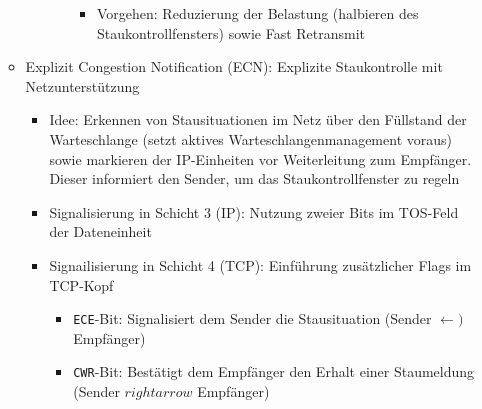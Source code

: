 \begin{itemize}
\begin{itemize}
\begin{enumerate}
\begin{itemize}
\begin{itemize}
					\item Vorgehen: Reduzierung der Belastung (halbieren des Staukontrollfensters) sowie Fast Retransmit
				\end{itemize}
			\end{itemize}
		\end{enumerate}
		\item Explizit Congestion Notification (ECN): Explizite Staukontrolle mit Netzunterstützung
		\begin{itemize}
			\item Idee: Erkennen von Stausituationen im Netz über den Füllstand der Warteschlange (setzt aktives Warteschlangenmanagement voraus) sowie markieren der IP-Einheiten vor Weiterleitung zum Empfänger. Dieser informiert den Sender, um das Staukontrollfenster zu regeln
			\item Signalisierung in Schicht 3 (IP): Nutzung zweier Bits im TOS-Feld der Dateneinheit
			\item Signailisierung in Schicht 4 (TCP): Einführung zusätzlicher Flags im TCP-Kopf
			\begin{itemize}
				\item \texttt{ECE}-Bit: Signalisiert dem Sender die Stausituation (Sender \(\leftarrow)\) Empfänger)
				\item \texttt{CWR}-Bit: Bestätigt dem Empfänger den Erhalt einer Staumeldung (Sender \(rightarrow\) Empfänger)
			\end{itemize}
		\end{itemize}
	\end{itemize}
\end{itemize}

